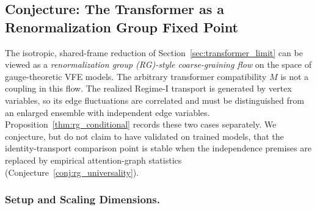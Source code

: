 \documentclass[twoside,11pt]{article}
\begin{document}
\subsection{Conjecture: The Transformer as a Renormalization Group Fixed Point}
\label{sec:rg_universality}

The isotropic, shared-frame reduction of Section~\ref{sec:transformer_limit} can be viewed as a \emph{renormalization group (RG)-style coarse-graining flow} on the space of gauge-theoretic VFE models. The arbitrary transformer compatibility $M$ is not a coupling in this flow. The realized Regime-I transport is generated by vertex variables, so its edge fluctuations are correlated and must be distinguished from an enlarged ensemble with independent edge variables. Proposition~\ref{thm:rg_conditional} records these two cases separately. We conjecture, but do not claim to have validated on trained models, that the identity-transport comparison point is stable when the independence premises are replaced by empirical attention-graph statistics (Conjecture~\ref{conj:rg_universality}).

\subsubsection{Setup and Scaling Dimensions.}
\end{document}
